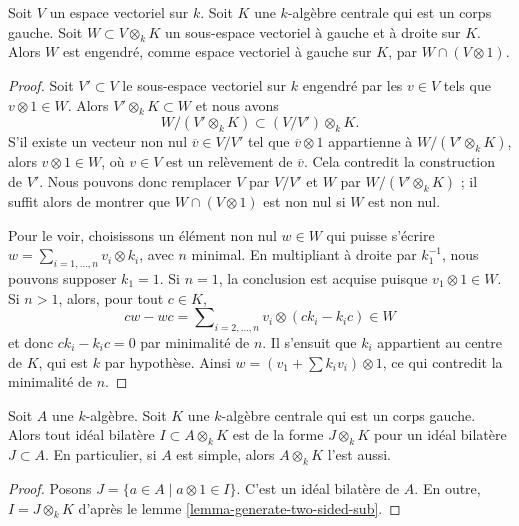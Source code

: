 \begin{lemma}
\label{lemma-generate-two-sided-sub}
Soit $V$ un espace vectoriel sur $k$. Soit $K$ une $k$-algèbre centrale qui
est un corps gauche. Soit $W \subset V \otimes_k K$ un sous-espace vectoriel
à gauche et à droite sur $K$. Alors $W$ est engendré, comme espace vectoriel
à gauche sur $K$, par $W \cap (V \otimes 1)$.
\end{lemma}

\begin{proof}
Soit $V' \subset V$ le sous-espace vectoriel sur $k$ engendré par les
$v \in V$ tels que $v \otimes 1 \in W$. Alors $V' \otimes_k K \subset W$ et
nous avons
$$
W/(V' \otimes_k K)  \subset  (V/V') \otimes_k K.
$$
S'il existe un vecteur non nul $\overline{v} \in V/V'$ tel que
$\overline{v} \otimes 1$ appartienne à $W/(V' \otimes_k K)$,
alors $v \otimes 1 \in W$, où $v \in V$ est un relèvement de $\overline{v}$.
Cela contredit la construction de $V'$. Nous pouvons donc remplacer
$V$ par $V/V'$ et $W$ par $W/(V' \otimes_k K)$ ; il suffit alors de montrer
que $W \cap (V \otimes 1)$ est non nul si $W$ est non nul.

\medskip\noindent
Pour le voir, choisissons un élément non nul $w \in W$ qui puisse s'écrire
$w = \sum_{i = 1, \ldots, n} v_i \otimes k_i$, avec $n$ minimal.
En multipliant à droite par $k_1^{-1}$, nous pouvons supposer $k_1 = 1$.
Si $n = 1$, la conclusion est acquise puisque $v_1 \otimes 1 \in W$.
Si $n > 1$, alors, pour tout $c \in K$,
$$
c w - w c = \sum\nolimits_{i = 2, \ldots, n} v_i \otimes (c k_i - k_i c) \in W
$$
et donc $c k_i - k_i c = 0$ par minimalité de $n$.
Il s'ensuit que $k_i$ appartient au centre de $K$, qui est $k$ par
hypothèse. Ainsi $w = (v_1 + \sum k_i v_i) \otimes 1$, ce qui contredit
la minimalité de $n$.
\end{proof}

\begin{lemma}
\label{lemma-generate-two-sided-ideal}
Soit $A$ une $k$-algèbre. Soit $K$ une $k$-algèbre centrale qui est un corps
gauche. Alors tout idéal bilatère $I \subset A \otimes_k K$ est de la forme
$J \otimes_k K$ pour un idéal bilatère $J \subset A$.
En particulier, si $A$ est simple, alors $A \otimes_k K$ l'est aussi.
\end{lemma}

\begin{proof}
Posons $J = \{a \in A \mid a \otimes 1 \in I\}$. C'est un idéal bilatère
de $A$. En outre, $I = J \otimes_k K$ d'après le
lemme \ref{lemma-generate-two-sided-sub}.
\end{proof}

